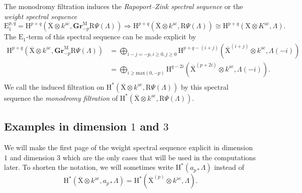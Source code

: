 \documentclass[10pt]{amsart}
\numberwithin{equation}{section}
\theoremstyle{plain}
\numberwithin{equation}{section}
\theoremstyle{definition}
\theoremstyle{remark}
\def\ac{\mathrm{ac}}
\def\ac{\mathrm{ac}}
\def\rmH{\mathrm{H}}
\def\rmE{\mathrm{E}}
\def\rmM{\mathrm{M}}
\def\rmX{\mathrm{X}}
\def\rmXbar{\overline{\rmX}}
\def\rmR{\mathrm{R}}
\newcommand{\Gr}{\mathbf{Gr}}
\begin{document}
The monodromy filtration induces the \emph{Rapoport--Zink spectral sequence} \cite{RZ} or the \emph{weight spectral sequence}
\begin{equation}\label{wt-seq}
\rmE^{p,q}_{1}= \rmH^{p+q}(\rmXbar\otimes{k^{\ac}}, \Gr^{\rmM}_{-p}\rmR\Psi(\Lambda))\Rightarrow \rmH^{p+q}(\rmXbar\otimes{k^{\ac}}, \rmR\Psi(\Lambda))\cong\rmH^{p+q}(\rmX\otimes{K^{\ac}}, \Lambda).
\end{equation}
The $\rmE_{1}$-term of this spectral sequence can be made explicit by
\begin{equation*}
\begin{aligned}
\rmH^{p+q}(\rmXbar\otimes{k^{\ac}}, \Gr^{\rmM}_{-p}\rmR\Psi(\Lambda))&=\bigoplus_{i-j=-p, i\geq0, j\geq0}\rmH^{p+q-(i+j)}(\rmXbar^{(i+j)}\otimes{k^{\ac}}, \Lambda(-i))\\
&=\bigoplus_{i\geq\mathrm{max}(0, -p)}\rmH^{q-2i}(\rmXbar^{(p+2i)}\otimes{k^{\ac}}, \Lambda(-i)).\\
\end{aligned}
\end{equation*}
We call the induced filtration on $\rmH^{\ast}(\rmXbar\otimes{k^{\ac}}, \rmR\Psi(\Lambda))$ by this spectral sequence the \emph{monodromy filtration} of $\rmH^{\ast}(\rmXbar\otimes{k^{\ac}}, \rmR\Psi(\Lambda))$.


\subsection{Examples in dimension $1$ and $3$} We will make the first page of the weight spectral sequence explicit in dimension $1$ and dimension $3$ which are the only cases that will be used in the computations later. To shorten the notation, we will sometimes write $\rmH^{*}(a_{p*}\Lambda)$ instead of 
\begin{equation*}
\rmH^{*}(\rmXbar\otimes{k^{\ac}}, a_{p*}\Lambda)=\rmH^{*}(\rmXbar^{(p)}\otimes{k^{\ac}}, \Lambda).
\end{equation*}
\end{document}
